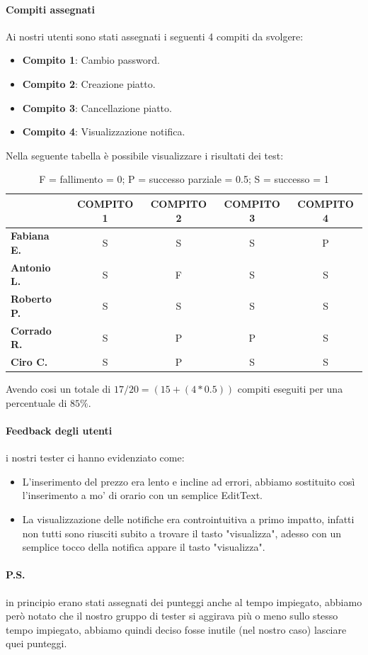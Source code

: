 \paragraph{Compiti assegnati} Ai nostri utenti sono stati assegnati i seguenti 4 compiti da svolgere:
\begin{itemize}
  \item \textbf{Compito 1}: Cambio password.
  \item \textbf{Compito 2}: Creazione piatto.
  \item \textbf{Compito 3}: Cancellazione piatto.
  \item \textbf{Compito 4}: Visualizzazione notifica.
\end{itemize}
Nella seguente tabella è possibile visualizzare i risultati dei test:
\begin{table}[H]
  \begin{center}
    \def\arraystretch{1.5}
    \begin{tabular}{|l|c|c|c|c|}
      \hline
                          & \textbf{COMPITO 1} & \textbf{COMPITO 2} & \textbf{COMPITO 3} & \textbf{COMPITO 4} \\
      \hline
      \textbf{Fabiana E.} & S                  & S                  & S                  & P                  \\
      \hline
      \textbf{Antonio L.} & S                  & F                  & S                  & S                  \\
      \hline
      \textbf{Roberto P.} & S                  & S                  & S                  & S                  \\
      \hline
      \textbf{Corrado R.} & S                  & P                  & P                  & S                  \\
      \hline
      \textbf{Ciro C.}    & S                  & P                  & S                  & S                  \\
      \hline
    \end{tabular}
  \end{center}
  \caption{F = fallimento = 0; P = successo parziale = 0.5; S = successo = 1}
\end{table}
Avendo cosi un totale di $17/20 = (15+(4*0.5))$ compiti eseguiti per una percentuale di $85\%$.
\paragraph{Feedback degli utenti} i nostri tester ci hanno evidenziato come:
\begin{itemize}
  \item L'inserimento del prezzo era lento e incline ad errori, abbiamo sostituito così l'inserimento a mo' di orario con un semplice EditText.
  \item La visualizzazione delle notifiche era controintuitiva a primo impatto, infatti non tutti sono riusciti subito a trovare il tasto "visualizza", adesso con un semplice tocco della notifica appare il tasto "visualizza".
\end{itemize}
\paragraph{P.S.} in principio erano stati assegnati dei punteggi anche al tempo impiegato, abbiamo però notato che il nostro gruppo di tester si aggirava più o meno sullo stesso tempo impiegato, abbiamo quindi deciso fosse inutile (nel nostro caso) lasciare quei punteggi.